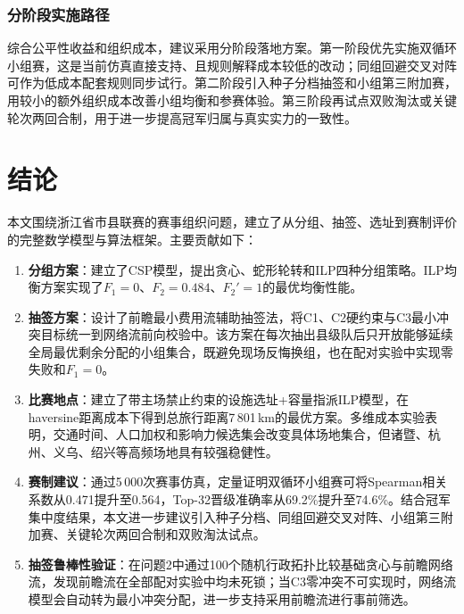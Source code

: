 \documentclass[12pt,a4paper]{article}
\begin{document}
\subsubsection{分阶段实施路径}

综合公平性收益和组织成本，建议采用分阶段落地方案。第一阶段优先实施双循环小组赛，这是当前仿真直接支持、且规则解释成本较低的改动；同组回避交叉对阵可作为低成本配套规则同步试行。第二阶段引入种子分档抽签和小组第三附加赛，用较小的额外组织成本改善小组均衡和参赛体验。第三阶段再试点双败淘汰或关键轮次两回合制，用于进一步提高冠军归属与真实实力的一致性。

\section{结论}

本文围绕浙江省市县联赛的赛事组织问题，建立了从分组、抽签、选址到赛制评价的完整数学模型与算法框架。主要贡献如下：

\begin{enumerate}[(1)]
  \item \textbf{分组方案}：建立了CSP模型，提出贪心、蛇形轮转和ILP四种分组策略。ILP均衡方案实现了$F_1=0$、$F_2=0.484$、$F_2'=1$的最优均衡性能。

  \item \textbf{抽签方案}：设计了前瞻最小费用流辅助抽签法，将C1、C2硬约束与C3最小冲突目标统一到网络流前向校验中。该方案在每次抽出县级队后只开放能够延续全局最优剩余分配的小组集合，既避免现场反悔换组，也在配对实验中实现零失败和$F_1=0$。

  \item \textbf{比赛地点}：建立了带主场禁止约束的设施选址+容量指派ILP模型，在haversine距离成本下得到总旅行距离7\,801\,km的最优方案。多维成本实验表明，交通时间、人口加权和影响力候选集会改变具体场地集合，但诸暨、杭州、义乌、绍兴等高频场地具有较强稳健性。

  \item \textbf{赛制建议}：通过5\,000次赛事仿真，定量证明双循环小组赛可将Spearman相关系数从0.471提升至0.564，Top-32晋级准确率从69.2\%提升至74.6\%。结合冠军集中度结果，本文进一步建议引入种子分档、同组回避交叉对阵、小组第三附加赛、关键轮次两回合制和双败淘汰试点。

  \item \textbf{抽签鲁棒性验证}：在问题2中通过100个随机行政拓扑比较基础贪心与前瞻网络流，发现前瞻流在全部配对实验中均未死锁；当C3零冲突不可实现时，网络流模型会自动转为最小冲突分配，进一步支持采用前瞻流进行事前筛选。
\end{enumerate}
\end{document}
